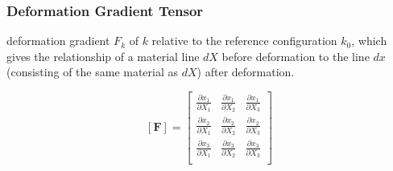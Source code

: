 \documentclass[notes]{beamer}
\begin{document}
\begin{frame}
\frametitle{Deformation Gradient Tensor}

deformation gradient $F_k$ of $k$ relative to the reference configuration $k_0$, 
which gives the relationship of a material line $dX$ before deformation to the line $dx$ (consisting of the same material as $dX$) after deformation.

\begin{equation*}
	\left[\mathbf{F}\right] = 
	\begin{bmatrix}
		\frac{\partial x_1}{\partial X_1} & \frac{\partial x_1}{\partial X_2} & \frac{\partial x_1}{\partial X_3} \\
		\frac{\partial x_2}{\partial X_1} & \frac{\partial x_2}{\partial X_2} & \frac{\partial x_2}{\partial X_3} \\		\frac{\partial x_3}{\partial X_1} & \frac{\partial x_3}{\partial X_2} & \frac{\partial x_3}{\partial X_3} \\
	\end{bmatrix}
\end{equation*}
\end{frame}
\end{document}
